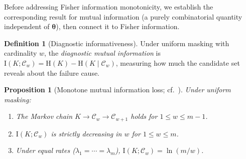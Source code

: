 \documentclass[11pt]{article}
\theoremstyle{definition}
\newtheorem{definition}{Definition}
\theoremstyle{plain}
\newtheorem{proposition}{Proposition}
\renewcommand{\v}[1]{\boldsymbol{#1}}
\newcommand{\btheta}{\v{\theta}}
\newcommand{\MI}{\mathrm{I}}        %
\newcommand{\Ent}{\mathrm{H}}       %
\begin{document}
Before addressing Fisher information monotonicity, we establish the
corresponding result for mutual information (a purely combinatorial
quantity independent of $\btheta$), then connect it to Fisher information.

\begin{definition}[Diagnostic informativeness]
\label{def:diagnostic-info}
Under uniform masking with cardinality $w$, the \emph{diagnostic mutual
information} is
$\MI(K; \mathcal{C}_w) = \Ent(K) - \Ent(K \mid \mathcal{C}_w)$,
measuring how much the candidate set reveals about the failure cause.
\end{definition}

\begin{proposition}[Monotone mutual information loss;
cf.~\citealp{towell2026exponential}]
\label{prop:mi-monotone}
Under uniform masking:
\begin{enumerate}[label=(\alph*)]
    \item The Markov chain $K \to \mathcal{C}_w \to \mathcal{C}_{w+1}$
    holds for $1 \leq w \leq m-1$.
    \item $\MI(K; \mathcal{C}_w)$ is strictly decreasing in $w$ for
    $1 \leq w \leq m$.
    \item Under equal rates ($\lambda_1 = \cdots = \lambda_m$),
    $\MI(K; \mathcal{C}_w) = \ln(m/w)$.
\end{enumerate}
\end{proposition}
\end{document}
